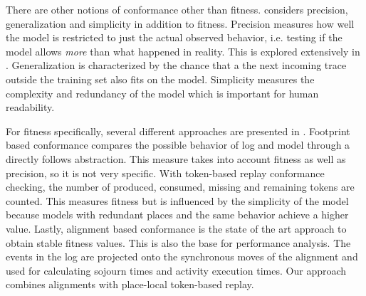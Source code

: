 There are other notions of conformance other than fitness. \cite{buijs2012role} considers precision, generalization and simplicity in addition to fitness. Precision measures how well the model is restricted to just the actual observed behavior, i.e. testing if the model allows \emph{more} than what happened in reality. This is explored extensively in \cite{munoz2016conformance}. Generalization is characterized by the chance that a the next incoming trace outside the training set also fits on the model. Simplicity measures the complexity and redundancy of the model which is important for human readability.

For fitness specifically, several different approaches are presented in \cite{van2016process}.
Footprint based conformance compares the possible behavior of log and model through a directly follows abstraction. This measure takes into account fitness as well as precision, so it is not very specific. With token-based replay conformance checking, the number of produced, consumed, missing and remaining tokens are counted. This measures fitness but is influenced by the simplicity of the model because models with redundant places and the same behavior achieve a higher value.
Lastly, alignment based conformance \cite{adriansyah2015measuring} is the state of the art approach to obtain stable fitness values.
This is also the base for performance analysis. The events in the log are projected onto the synchronous moves of the alignment and used for calculating sojourn times and activity execution times.
Our approach combines alignments with place-local token-based replay.

